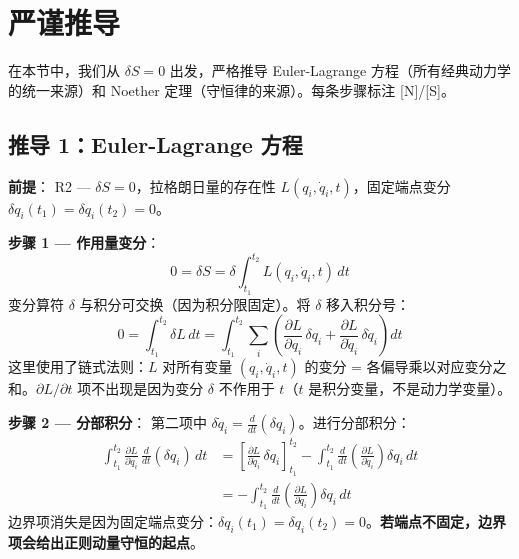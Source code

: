 
\section{严谨推导}

在本节中，我们从 $\delta S = 0$ 出发，严格推导 Euler-Lagrange 方程（所有经典动力学的统一来源）和 Noether 定理（守恒律的来源）。每条步骤标注 [N]/[S]。

\subsection{推导 1：Euler-Lagrange 方程}

\textbf{前提}：\fbox{[N]} R2 — $\delta S = 0$，拉格朗日量的存在性 $L(q_i, \dot{q}_i, t)$，固定端点变分 $\delta q_i(t_1) = \delta q_i(t_2) = 0$。

\textbf{步骤 1 — 作用量变分}：
\begin{equation}
0 = \delta S = \delta \int_{t_1}^{t_2} L(q_i, \dot{q}_i, t)\, dt
\end{equation}
\fbox{[S]} 变分算符 $\delta$ 与积分可交换（因为积分限固定）。将 $\delta$ 移入积分号：
\begin{equation}
0 = \int_{t_1}^{t_2} \delta L\, dt = \int_{t_1}^{t_2} \sum_i\left(
\frac{\partial L}{\partial q_i}\,\delta q_i
+ \frac{\partial L}{\partial \dot{q}_i}\,\delta \dot{q}_i
\right) dt
\end{equation}
\fbox{[S]} 这里使用了链式法则：$L$ 对所有变量 $(q_i, \dot{q}_i, t)$ 的变分 = 各偏导乘以对应变分之和。$\partial L/\partial t$ 项不出现是因为变分 $\delta$ 不作用于 $t$（$t$ 是积分变量，不是动力学变量）。

\textbf{步骤 2 — 分部积分}：\fbox{[S]} 第二项中 $\delta \dot{q}_i = \frac{d}{dt}(\delta q_i)$。进行分部积分：
\begin{align}
\int_{t_1}^{t_2} \frac{\partial L}{\partial \dot{q}_i}\,\frac{d}{dt}(\delta q_i)\, dt
&= \left[ \frac{\partial L}{\partial \dot{q}_i}\,\delta q_i \right]_{t_1}^{t_2}
- \int_{t_1}^{t_2} \frac{d}{dt}\!\left(\frac{\partial L}{\partial \dot{q}_i}\right) \delta q_i\, dt \\
&= - \int_{t_1}^{t_2} \frac{d}{dt}\!\left(\frac{\partial L}{\partial \dot{q}_i}\right) \delta q_i\, dt
\end{align}
\fbox{[N]} 边界项消失$\!$是因为固定端点变分：$\delta q_i(t_1) = \delta q_i(t_2) = 0$。\textbf{若端点不固定，边界项会给出正则动量守恒的起点}。

